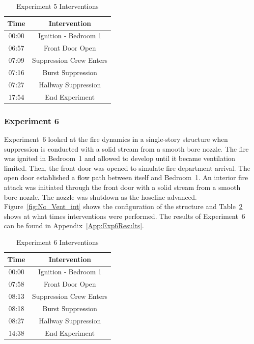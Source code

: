 \documentclass[12pt,oneside]{book}
\begin{document}

\begin{table}[!ht]
	\centering
	\caption{Experiment 5 Interventions}
	\begin{tabular}{|c|c|} 
		\hline
		Time & Intervention \\ \hline \hline
		00:00 & Ignition - Bedroom 1 \\ \hline
		06:57 & Front Door Open \\ \hline
		07:09 & Suppression Crew Enters\\ \hline
		07:16 & Burst Suppression \\ \hline 
		07:27 & Hallway Suppression \\ \hline
		17:54 & End Experiment\\ \hline
	\end{tabular}
	\label{Table:Exp5Interventions}
\end{table}

\FloatBarrier
\clearpage

\subsubsection{Experiment 6}
Experiment~6 looked at the fire dynamics in a single-story structure when suppression is conducted with a solid stream from a smooth bore nozzle. The fire was ignited in Bedroom~1 and allowed to develop until it became ventilation limited. Then, the front door was opened to simulate fire department arrival. The open door established a flow path between itself and Bedroom~1. An interior fire attack was initiated through the front door with a solid stream from a smooth bore nozzle. The nozzle was shutdown as the hoseline advanced. Figure~\ref{fig:No_Vent_int} shows the configuration of the structure and Table~\ref{Table:Exp6Interventions} shows at what times interventions were performed. The results of Experiment~6 can be found in Appendix~\ref{App:Exp6Results}. 


\begin{table}[!ht]
	\centering
	\caption{Experiment 6 Interventions}
	\begin{tabular}{|c|c|} 
		\hline
		Time & Intervention \\ \hline \hline
		00:00 & Ignition - Bedroom 1 \\ \hline
		07:58 & Front Door Open \\ \hline
		08:13 & Suppression Crew Enters\\ \hline
		08:18 & Burst Suppression \\ \hline 
		08:27 & Hallway Suppression \\ \hline
		14:38 & End Experiment\\ \hline
	\end{tabular}
	\label{Table:Exp6Interventions}
\end{table}
\end{document}
